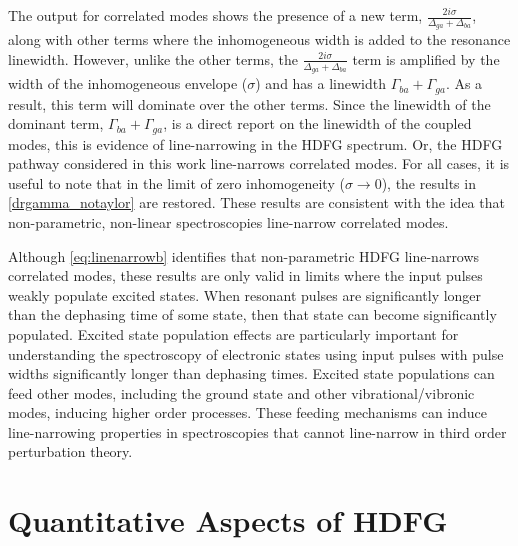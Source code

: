 \documentclass[aip, jcp, reprint, onecolumn, nofootinbib]{revtex4-2}
\begin{document}
The output for correlated modes shows the presence of a new term, $\frac{2i\sigma}{\Delta_{ga} + \Delta_{ba}}$, along with other terms where the inhomogeneous width is added to the resonance linewidth. 
However, unlike the other terms, the $\frac{2i\sigma}{\Delta_{ga} + \Delta_{ba}}$ term is amplified by the width of the inhomogeneous envelope ($\sigma$) and has a linewidth $\Gamma_{ba} + \Gamma_{ga}$.
As a result, this term will dominate over the other terms. 
Since the linewidth of the dominant term, $\Gamma_{ba} + \Gamma_{ga}$, is a direct report on the linewidth of the coupled modes, this is evidence of line-narrowing in the HDFG spectrum. \cite{RN103}
Or, the HDFG pathway considered in this work line-narrows correlated modes. 
For all cases, it is useful to note that in the limit of zero inhomogeneity ($\sigma \rightarrow 0$), the results in \autoref{drgamma_notaylor} are restored.
These results are consistent with the idea that non-parametric, non-linear spectroscopies line-narrow correlated modes. \cite{Dick83_1, Carlson1990line}

Although \autoref{eq:linenarrowb} identifies that non-parametric HDFG line-narrows correlated modes, these results are only valid in limits where the input pulses weakly populate excited states.
When resonant pulses are significantly longer than the dephasing time of some state, then that state can become significantly populated.
Excited state population effects are particularly important for understanding the spectroscopy of electronic states using input pulses with pulse widths significantly longer than dephasing times. \cite{RN471}
Excited state populations can feed other modes, including the ground state and other vibrational/vibronic modes, inducing higher order processes.\cite{RN471}
These feeding mechanisms can induce line-narrowing properties in spectroscopies that cannot line-narrow in third order perturbation theory.\cite{RN471, RN410}

\section{Quantitative Aspects of HDFG}\label{quant}
\end{document}
